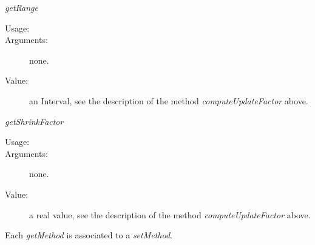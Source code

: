 \begin{description}
\item \textit{getRange}
\begin{description}
\item[Usage:] \rule{0pt}{1em}
\item[Arguments:] none. \rule{0pt}{1em}
\item[Value:] an Interval, see the description of the method
\textit{computeUpdateFactor} above.
\end{description}
\bigskip

\item \textit{getShrinkFactor}
\begin{description}
\item[Usage:] \rule{0pt}{1em}
\item[Arguments:] none. \rule{0pt}{1em}
\item[Value:] a real value, see the description of the method
\textit{computeUpdateFactor} above.
\end{description}
\bigskip

\end{description}

Each  \textit{getMethod}  is associated to a \textit{setMethod}.

